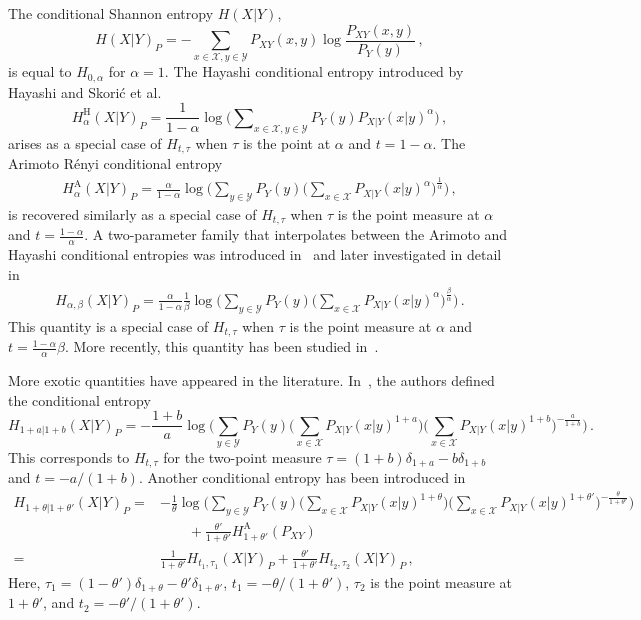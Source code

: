 \documentclass[aps,pra,11pt,onecolumn,nofootinbib,tightenlines]{revtex4-2}
\theoremstyle{definition}
\newcommand{\X}{\mathcal{X}}
\newcommand{\Y}{\mathcal{Y}}
\begin{document}
The conditional Shannon entropy $H(X|Y)$,
\begin{equation}
    H(X|Y)_P=-\sum_{x \in \X,y\in\Y} P_{XY}(x,y)\log{\frac{P_{XY}(x,y)}{P_Y(y)}} \,,
\end{equation}
is equal to \(H_{0,\alpha}\) for \(\alpha = 1\).
The Hayashi conditional entropy introduced by Hayashi and Skorić et al.~\cite{hayashi2011exponential,vskoric2011sharp}
\begin{equation}
H^\text{H}_{\alpha}(X|Y)_P=\frac{1}{1-\alpha}\log{\Big(\sum\nolimits_{x\in\X,y\in\Y} P_Y(y) P_{X|Y}(x|y)^\alpha\Big)} \,,
\end{equation}
arises as a special case of $H_{t,\tau}$ when $\tau$ is the point at $\alpha$ and $t = 1 - \alpha$. The Arimoto Rényi conditional entropy~\cite{arimoto1977information} 
\begin{align}
H^\text{A}_{\alpha}(X|Y)_P=\frac{\alpha}{1-\alpha}\log{\bigg(\sum_{y\in \Y} P_Y(y)\Big(\sum_{x \in \X} P_{X|Y}(x|y)^\alpha\Big)^\frac{1}{\alpha}\bigg)} \,,
\end{align}
is recovered similarly as a special case of $H_{t,\tau}$ when $\tau$ is the point measure at $\alpha$ and $t = \frac{1 - \alpha}{\alpha}$. A two-parameter family that interpolates between the Arimoto and Hayashi conditional entropies was introduced in~\cite{hayashi2016equivocations} and later investigated in detail in~\cite{rubboli2024quantum}
\begin{align}
\label{eq: H alpha beta}
H_{\alpha,\beta}(X|Y)_P=\frac{\alpha}{1-\alpha}\frac{1}{\beta}\log{\bigg(\sum_{y \in \Y} P_Y(y)\Big(\sum_{x \in \X} P_{X|Y}(x|y)^\alpha\Big)^\frac{\beta} {\alpha}\bigg)} \,.
\end{align}
This quantity is a special case of $H_{t,\tau}$ when $\tau$ is the point measure at $\alpha$ and $t = \frac{1 - \alpha}{\alpha} \beta$. More recently, this quantity has been studied in~\cite{li2025two}.


More exotic quantities have appeared in the literature. In~\cite{tan2018analysis}, the authors defined the conditional entropy
\begin{equation}
    H_{1+a|1+b}(X|Y)_P=-\frac{1+b}{a}\log{\bigg(\sum_{y \in \Y} P_Y(y)\Big(\sum_{x \in \X} P_{X|Y}(x|y)^{1+a}\Big)\Big(\sum_{x \in \X} P_{X|Y}(x|y)^{1+b}\Big)^{-\frac{a}{1+b}}\bigg)} \,.
\end{equation}
This corresponds to $H_{t,\tau}$ for the two-point measure $\tau=(1+b)\delta_{1+a}-b\delta_{1+b}$ and $t=-a/(1+b)$.
Another conditional entropy has been introduced in~\cite{hayashi2016uniform}
\begin{align}
    H_{1+\theta|1+\theta'}(X|Y)_P=&-\frac{1}{\theta}\log{\bigg(\sum_{y \in \Y} P_Y(y)\Big(\sum_{x \in \X} P_{X|Y}(x|y)^{1+\theta}\Big)\Big(\sum_{x \in \X} P_{X|Y}(x|y)^{1+\theta'}\Big)^{-\frac{\theta}{1+\theta'}}\bigg)} \\
    &\qquad + \frac{\theta'}{1+\theta'}H^{\text{A}}_{1+\theta'}(P_{XY}) \\
    =&\frac{1}{1+\theta'}H_{t_1,\tau_1}(X|Y)_P+\frac{\theta'}{1+\theta'}H_{t_2,\tau_2}(X|Y)_P\,,
\end{align}
Here, $\tau_1=(1-\theta')\delta_{1+\theta}-\theta'\delta_{1+\theta'}$, $t_1=-\theta/(1+\theta')$, $\tau_2$ is the point measure at $1+\theta'$, and $t_2=-\theta'/(1+\theta')$.
\end{document}
